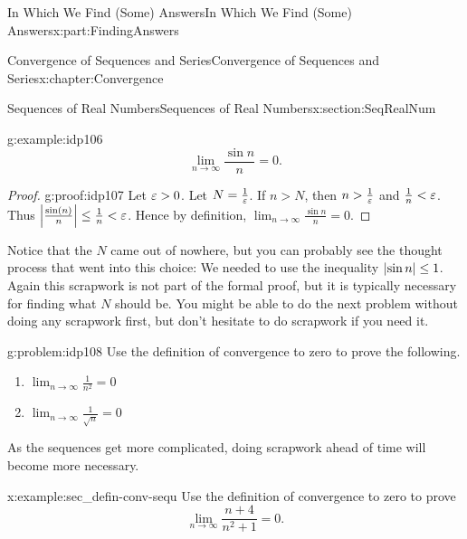 \begin{partptx}{In Which We Find (Some) Answers}{}{In Which We Find (Some) Answers}{}{}{x:part:FindingAnswers}
\begin{chapterptx}{Convergence of Sequences and Series}{}{Convergence of Sequences and Series}{}{}{x:chapter:Convergence}
\begin{sectionptx}{Sequences of Real Numbers}{}{Sequences of Real Numbers}{}{}{x:section:SeqRealNum}
\begin{example}{}{g:example:idp106}
				\begin{equation*}
					\lim_{n\rightarrow\infty}\frac{\sin n}{n}=0\text{.}
				\end{equation*}
			\end{example}
			\begin{proof}{}{g:proof:idp107}
				Let \(\varepsilon>0\). Let \(N=\frac{1}{\varepsilon}\). If \(n>N\), then \(n>\frac{1}{\varepsilon}\) and \(\frac{1}{n}< \varepsilon\). Thus \(\left|\frac{\sin(n)}{n}\right|\leq\frac{1}{n}< \varepsilon\). Hence by definition, \(\lim_{n\rightarrow\infty}\frac{\sin n}{n}=0\).%
			\end{proof}
			Notice that the \(N\) came out of nowhere, but you can probably see the thought process that went into this choice: We needed to use the inequality \(\left|\sin n\right|\leq 1\). Again this scrapwork is not part of the formal proof, but it is typically necessary for finding what \(N\) should be. You might be able to do the next problem without doing any scrapwork first, but don't hesitate to do scrapwork if you need it.%
			\begin{problem}{}{g:problem:idp108}%
				 Use the definition of convergence to zero to prove the following.%
				\begin{enumerate}[font=\bfseries,label=(\alph*),ref=\alph*]
					\item{}\(\displaystyle\lim_{n\rightarrow\infty}\frac{1}{n^2}=0\)%
					\item{}\(\displaystyle\lim_{n\rightarrow\infty}\frac{1}{\sqrt{n}}=0\)%
				\end{enumerate}
			\end{problem}
			As the sequences get more complicated, doing scrapwork ahead of time will become more necessary.%
			\begin{example}{}{x:example:sec_defin-conv-sequ}%
				Use the definition of convergence to zero to prove%
				\begin{equation*}
					\lim_{n\rightarrow\infty}\frac{n+4}{n^2+1}=0\text{.}
				\end{equation*}
				\par
				\par

\end{example}
\end{sectionptx}
\end{chapterptx}
\end{partptx}
